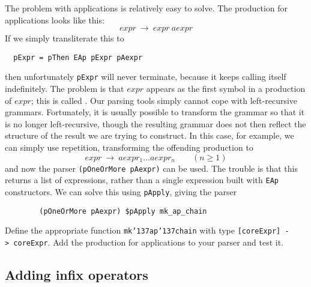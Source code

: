 The problem with applications is relatively easy to solve.  The
production for applications looks like this:
\[
expr ~ \rightarrow ~ expr ~aexpr
\]
If we simply transliterate this to
\begin{verbatim}
  pExpr = pThen EAp pExpr pAexpr
\end{verbatim}
then unfortunately \mbox{\tt pExpr} will never terminate, because it keeps calling
itself indefinitely.  The problem is that $expr$ appears as the first symbol
in a production of $expr$; this is called .
Our parsing tools simply cannot cope with left-recursive grammars.
Fortunately, it is usually possible to transform the grammar so that it
is no longer left-recursive, though the resulting grammar does not then
reflect the structure of the result we are trying to construct.  In this case,
for example, we can simply use
repetition, transforming the offending production to
\[
expr ~ \rightarrow ~ aexpr_1 \ldots aexpr_n \qquad (n \geq 1)
\]
and now the parser \mbox{\tt (pOneOrMore\ pAexpr)} can be used.  The trouble is
that this returns a list of expressions, rather than a single
expression built with \mbox{\tt EAp} constructors.  We can solve this using
\mbox{\tt pApply}, giving the parser
\begin{verbatim}
        (pOneOrMore pAexpr) $pApply mk_ap_chain
\end{verbatim}
\begin{exercise}
Define the appropriate function \mbox{\tt mk{\char'137}ap{\char'137}chain} with type
\mbox{\tt [coreExpr]\ ->\ coreExpr}.
Add the production for applications to your parser and test it.
\end{exercise}

\subsection{Adding infix operators}

